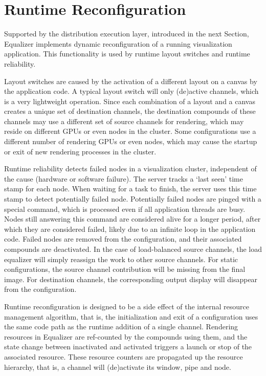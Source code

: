 \section{Runtime Reconfiguration}

Supported by the distribution execution layer, introduced in the next Section,
Equalizer implements dynamic reconfiguration of a running visualization
application. This functionality is used by runtime layout switches and runtime
reliability.

Layout switches are caused by the activation of a different layout on a canvas
by the application code. A typical layout switch will only (de)active channels,
which is a very lightweight operation. Since each combination of a layout and a
canvas creates a unique set of destination channels, the destination compounds
of these channels may use a different set of source channels for rendering,
which may reside on different GPUs or even nodes in the cluster. Some
configurations use a different number of rendering GPUs or even nodes, which
may cause the startup or exit of new rendering processes in the cluster.

Runtime reliability detects failed nodes in a visualization cluster,
independent of the cause (hardware or software failure). The server tracks a
`last seen' time stamp for each node. When waiting for a task to finish, the
server uses this time stamp to detect potentially failed node. Potentially
failed nodes are pinged with a special command, which is processed even if all
application threads are busy. Nodes still answering this command are considered
alive for a longer period, after which they are considered failed, likely due
to an infinite loop in the application code. Failed nodes are removed from the
configuration, and their associated compounds are deactivated. In the case of
load-balanced source channels, the load equalizer will simply reassign the work
to other source channels. For static configurations, the source channel
contribution will be missing from the final image. For destination channels,
the corresponding output display will disappear from the configuration.

Runtime reconfiguration is designed to be a side effect of the internal resource
management algorithm, that is, the initialization and exit of a configuration
uses the same code path as the runtime addition of a single channel. Rendering
resources in Equalizer are ref-counted by the compounds using them, and the
state change between inactivated and activated triggers a launch or stop of the
associated resource. These resource counters are propagated up the resource
hierarchy, that is, a channel will (de)activate its window, pipe and node.

